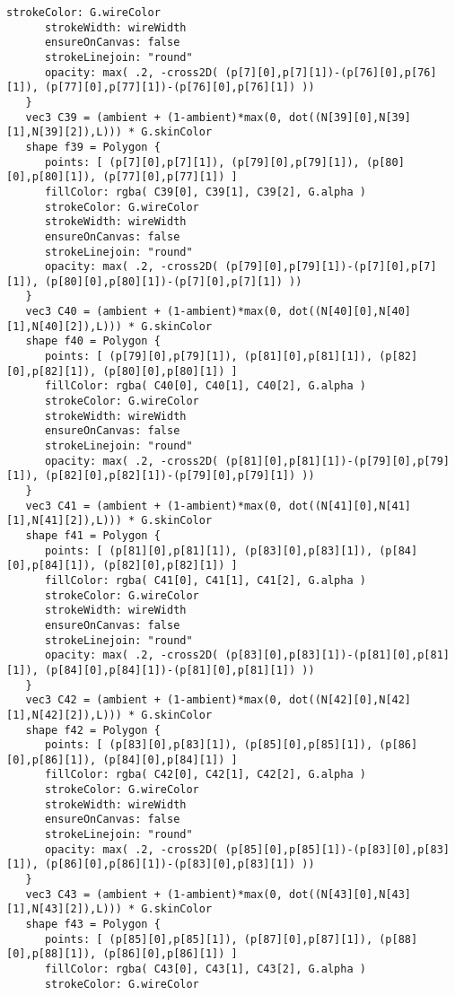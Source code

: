 \begin{lstlisting}[language=Sty-RT,escapechar=@]
      strokeColor: G.wireColor
      strokeWidth: wireWidth
      ensureOnCanvas: false
      strokeLinejoin: "round"
      opacity: max( .2, -cross2D( (p[7][0],p[7][1])-(p[76][0],p[76][1]), (p[77][0],p[77][1])-(p[76][0],p[76][1]) ))
   }
   vec3 C39 = (ambient + (1-ambient)*max(0, dot((N[39][0],N[39][1],N[39][2]),L))) * G.skinColor
   shape f39 = Polygon {
      points: [ (p[7][0],p[7][1]), (p[79][0],p[79][1]), (p[80][0],p[80][1]), (p[77][0],p[77][1]) ]
      fillColor: rgba( C39[0], C39[1], C39[2], G.alpha )
      strokeColor: G.wireColor
      strokeWidth: wireWidth
      ensureOnCanvas: false
      strokeLinejoin: "round"
      opacity: max( .2, -cross2D( (p[79][0],p[79][1])-(p[7][0],p[7][1]), (p[80][0],p[80][1])-(p[7][0],p[7][1]) ))
   }
   vec3 C40 = (ambient + (1-ambient)*max(0, dot((N[40][0],N[40][1],N[40][2]),L))) * G.skinColor
   shape f40 = Polygon {
      points: [ (p[79][0],p[79][1]), (p[81][0],p[81][1]), (p[82][0],p[82][1]), (p[80][0],p[80][1]) ]
      fillColor: rgba( C40[0], C40[1], C40[2], G.alpha )
      strokeColor: G.wireColor
      strokeWidth: wireWidth
      ensureOnCanvas: false
      strokeLinejoin: "round"
      opacity: max( .2, -cross2D( (p[81][0],p[81][1])-(p[79][0],p[79][1]), (p[82][0],p[82][1])-(p[79][0],p[79][1]) ))
   }
   vec3 C41 = (ambient + (1-ambient)*max(0, dot((N[41][0],N[41][1],N[41][2]),L))) * G.skinColor
   shape f41 = Polygon {
      points: [ (p[81][0],p[81][1]), (p[83][0],p[83][1]), (p[84][0],p[84][1]), (p[82][0],p[82][1]) ]
      fillColor: rgba( C41[0], C41[1], C41[2], G.alpha )
      strokeColor: G.wireColor
      strokeWidth: wireWidth
      ensureOnCanvas: false
      strokeLinejoin: "round"
      opacity: max( .2, -cross2D( (p[83][0],p[83][1])-(p[81][0],p[81][1]), (p[84][0],p[84][1])-(p[81][0],p[81][1]) ))
   }
   vec3 C42 = (ambient + (1-ambient)*max(0, dot((N[42][0],N[42][1],N[42][2]),L))) * G.skinColor
   shape f42 = Polygon {
      points: [ (p[83][0],p[83][1]), (p[85][0],p[85][1]), (p[86][0],p[86][1]), (p[84][0],p[84][1]) ]
      fillColor: rgba( C42[0], C42[1], C42[2], G.alpha )
      strokeColor: G.wireColor
      strokeWidth: wireWidth
      ensureOnCanvas: false
      strokeLinejoin: "round"
      opacity: max( .2, -cross2D( (p[85][0],p[85][1])-(p[83][0],p[83][1]), (p[86][0],p[86][1])-(p[83][0],p[83][1]) ))
   }
   vec3 C43 = (ambient + (1-ambient)*max(0, dot((N[43][0],N[43][1],N[43][2]),L))) * G.skinColor
   shape f43 = Polygon {
      points: [ (p[85][0],p[85][1]), (p[87][0],p[87][1]), (p[88][0],p[88][1]), (p[86][0],p[86][1]) ]
      fillColor: rgba( C43[0], C43[1], C43[2], G.alpha )
      strokeColor: G.wireColor

\end{lstlisting}
